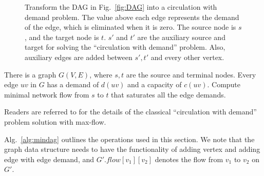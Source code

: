 \begin{figure*}[h!]
    \caption{Transform the DAG in Fig.~\ref{fig:DAG} into a circulation with demand problem. 
    The value above each edge represents the demand of the edge, which is eliminated when it is zero.
    The source node is $s$, and the target node is $t$. $s'$ and $t'$ are the auxiliary source and target for solving the ``circulation with demand'' problem.
    Also, auxiliary edges are added between $s', t'$ and every other vertex.}
    \label{fig:sc-flow}
\end{figure*}


\begin{problem}
There is a graph $G(V,E)$, where $s,t$ are the source and terminal nodes. 
Every edge $uv$ in $G$ has a demand of $d(uv)$ and a capacity of $c(uv)$. 
Compute minimal network flow from $s$ to $t$ that saturates all the edge 
demands.
\end{problem}

Readers are referred to \cite{kleinberg2006algorithm} for %
the details of the classical ``circulation with demand'' problem solution with max-flow. 

Alg.~\ref{alg:mindag} outlines the operations
used in this section. We note that the 
graph data structure needs to have the functionality of adding vertex and adding 
edge with edge demand, and $G'.flow[v_1][v_2]$ denotes the flow from $v_1$ to $v_2$ on $G'$.

